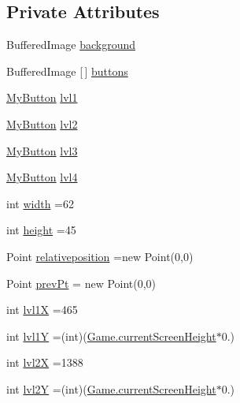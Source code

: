 \subsection*{Private Attributes}
\begin{DoxyCompactItemize}
\item 
Buffered\+Image \hyperlink{classui_1_1_level_menu_a714354485419fb2b615f17fcce85657e}{background}
\item 
Buffered\+Image \mbox{[}$\,$\mbox{]} \hyperlink{classui_1_1_level_menu_a6d137cdbda7a4bbab7f28aa72fec0883}{buttons}
\item 
\hyperlink{classui_1_1_my_button}{My\+Button} \hyperlink{classui_1_1_level_menu_a2e10ffa510b49e3243464d9fe0548ab1}{lvl1}
\item 
\hyperlink{classui_1_1_my_button}{My\+Button} \hyperlink{classui_1_1_level_menu_aa0e0bb26227a5e349ce446c1aeaa3a77}{lvl2}
\item 
\hyperlink{classui_1_1_my_button}{My\+Button} \hyperlink{classui_1_1_level_menu_aa528df3e872324e8ce0c3cd82930113b}{lvl3}
\item 
\hyperlink{classui_1_1_my_button}{My\+Button} \hyperlink{classui_1_1_level_menu_a4240d0138387907a78ef7cf6c4b37f4f}{lvl4}
\item 
int \hyperlink{classui_1_1_level_menu_a2474a5474cbff19523a51eb1de01cda4}{width} =62
\item 
int \hyperlink{classui_1_1_level_menu_ad12fc34ce789bce6c8a05d8a17138534}{height} =45
\item 
Point \hyperlink{classui_1_1_level_menu_ae3a19a411ad9e263452836e3d42d4761}{relativeposition} =new Point(0,0)
\item 
Point \hyperlink{classui_1_1_level_menu_a4e519a889f31dafb22a3d869cd7e3fc2}{prev\+Pt} = new Point(0,0)
\item 
int \hyperlink{classui_1_1_level_menu_a49f83bbf24bd8756572457aa0319f3db}{lvl1X} =465
\item 
int \hyperlink{classui_1_1_level_menu_aaa2a2e1bfc7b31099f1bfc3818ae71ca}{lvl1Y} =(int)(\hyperlink{classprogetto_1_1_game_a1aca3161d2e02e5dc13bb3cae83a8ad1}{Game.\+current\+Screen\+Height}$\ast$0.)
\item 
int \hyperlink{classui_1_1_level_menu_af0481cd4056ad10d2489fdc65c6f73f1}{lvl2X} =1388
\item 
int \hyperlink{classui_1_1_level_menu_ab3701c0691f273011e232dea15bb5fbd}{lvl2Y} =(int)(\hyperlink{classprogetto_1_1_game_a1aca3161d2e02e5dc13bb3cae83a8ad1}{Game.\+current\+Screen\+Height}$\ast$0.)
\item 

\end{DoxyCompactItemize}
